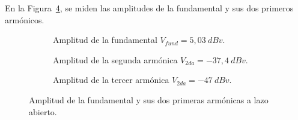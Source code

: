       En la Figura~\ref{fig:Exp7AmplFundYArmonicasLA}, se miden las amplitudes de la fundamental y sus 
      dos primeros armónicos.

    \begin{figure}[H]
        \centering
        \begin{subfigure}[H]{0.48\textwidth}
          \caption{Amplitud de la fundamental $V_{fund}=5,03~dBv$.}
          \label{fig:Exp7AmpFundamentalLA}
        \end{subfigure}
        \hfill 
        \begin{subfigure}[H]{0.48\textwidth}
          \caption{Amplitud de la segunda armónica $V_{2da}=-37,4~dBv$.}
          \label{fig:Exp7AmpSegundaLA}
        \end{subfigure}     
        \begin{subfigure}[H]{0.48\textwidth}
          \caption{Amplitud de la tercer armónica $V_{2da}=-47~dBv$.}
          \label{fig:Exp7AmpTercerLA}
        \end{subfigure}   
        \caption{Amplitud de la fundamental y sus dos primeras armónicas a lazo abierto.}
        \label{fig:Exp7AmplFundYArmonicasLA}
      \end{figure}


